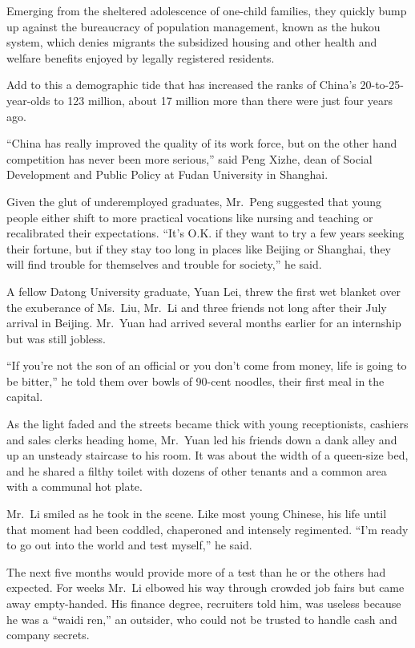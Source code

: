 ﻿\documentclass[12pt]{article}
\begin{document}
Emerging from the sheltered adolescence of one-child families, they quickly bump up against the
bureaucracy of population management, known as the hukou system, which denies migrants the
subsidized housing and other health and welfare benefits enjoyed by legally registered residents.

Add to this a demographic tide that has increased the ranks of China's 20-to-25-year-olds to 123
million, about 17 million more than there were just four years ago.

``China has really improved the quality of its work force, but on the other hand competition has
never been more serious,'' said Peng Xizhe, dean of Social Development and Public Policy at Fudan
University in Shanghai.

Given the glut of underemployed graduates, Mr.~Peng suggested that young people either shift to more
practical vocations like nursing and teaching or recalibrated their expectations. ``It's O.K. if
they want to try a few years seeking their fortune, but if they stay too long in places like Beijing
or Shanghai, they will find trouble for themselves and trouble for society,'' he said.

A fellow Datong University graduate, Yuan Lei, threw the first wet blanket over the exuberance of
Ms.~Liu, Mr.~Li and three friends not long after their July arrival in Beijing. Mr.~Yuan had arrived
several months earlier for an internship but was still jobless.

``If you're not the son of an official or you don't come from money, life is going to be bitter,''
he told them over bowls of 90-cent noodles, their first meal in the capital.

As the light faded and the streets became thick with young receptionists, cashiers and sales clerks
heading home, Mr.~Yuan led his friends down a dank alley and up an unsteady staircase to his room.
It was about the width of a queen-size bed, and he shared a filthy toilet with dozens of other
tenants and a common area with a communal hot plate.

Mr.~Li smiled as he took in the scene. Like most young Chinese, his life until that moment had been
coddled, chaperoned and intensely regimented. ``I'm ready to go out into the world and test
myself,'' he said.

The next five months would provide more of a test than he or the others had expected. For weeks
Mr.~Li elbowed his way through crowded job fairs but came away empty-handed. His finance degree,
recruiters told him, was useless because he was a ``waidi ren,'' an outsider, who could not be
trusted to handle cash and company secrets.
\end{document}
